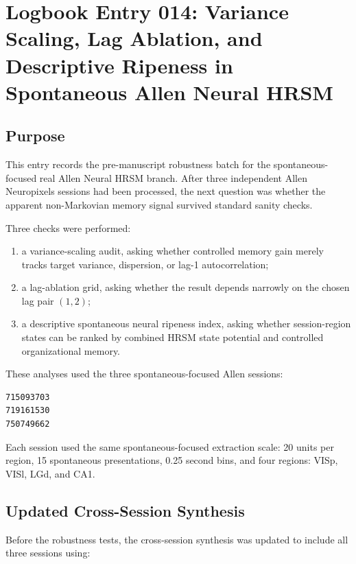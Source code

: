 \section{Logbook Entry 014: Variance Scaling, Lag Ablation, and Descriptive Ripeness in Spontaneous Allen Neural HRSM}
\label{sec:logbook-entry-014-variance-ablation-ripeness}

\subsection{Purpose}

This entry records the pre-manuscript robustness batch for the spontaneous-focused real Allen Neural HRSM branch. After three independent Allen Neuropixels sessions had been processed, the next question was whether the apparent non-Markovian memory signal survived standard sanity checks.

Three checks were performed:

\begin{enumerate}
    \item a variance-scaling audit, asking whether controlled memory gain merely tracks target variance, dispersion, or lag-1 autocorrelation;
    \item a lag-ablation grid, asking whether the result depends narrowly on the chosen lag pair \((1,2)\);
    \item a descriptive spontaneous neural ripeness index, asking whether session-region states can be ranked by combined HRSM state potential and controlled organizational memory.
\end{enumerate}

These analyses used the three spontaneous-focused Allen sessions:

\begin{verbatim}
715093703
719161530
750749662
\end{verbatim}

Each session used the same spontaneous-focused extraction scale: 20 units per region, 15 spontaneous presentations, 0.25 second bins, and four regions: VISp, VISl, LGd, and CA1.

\subsection{Updated Cross-Session Synthesis}

Before the robustness tests, the cross-session synthesis was updated to include all three sessions using:

